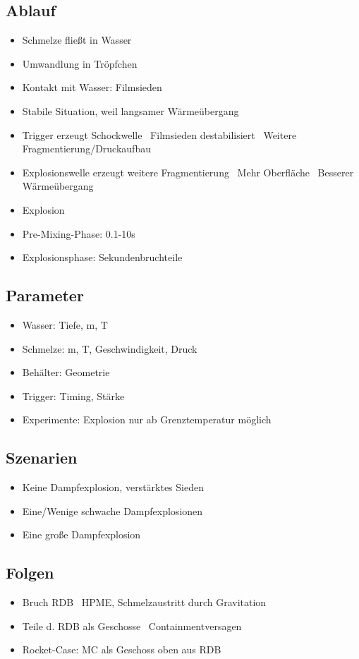 \documentclass[12pt]{article}
\begin{document}
\subsection{Ablauf}
\begin{itemize}[noitemsep]
	\item Schmelze fließt in Wasser
	\item Umwandlung in Tröpfchen
	\item Kontakt mit Wasser: Filmsieden
	\item Stabile Situation, weil langsamer Wärmeübergang
	\item Trigger erzeugt Schockwelle \textrightarrow\ Filmsieden destabilisiert \textrightarrow\ Weitere Fragmentierung/Druckaufbau
	\item Explosionswelle erzeugt weitere Fragmentierung \textrightarrow\ Mehr Oberfläche \textrightarrow\ Besserer Wärmeübergang
	\item Explosion
	\item Pre-Mixing-Phase: 0.1-10s
	\item Explosionsphase: Sekundenbruchteile
\end{itemize}

\subsection{Parameter}
\begin{itemize}[noitemsep]
	\item Wasser: Tiefe, m, T
	\item Schmelze: m, T, Geschwindigkeit, Druck
	\item Behälter: Geometrie
	\item Trigger: Timing, Stärke
	\item Experimente: Explosion nur ab Grenztemperatur möglich
\end{itemize}

\subsection{Szenarien}
\begin{itemize}[noitemsep]
	\item Keine Dampfexplosion, verstärktes Sieden
	\item Eine/Wenige schwache Dampfexplosionen
	\item Eine große Dampfexplosion
\end{itemize}

\subsection{Folgen}
\begin{itemize}[noitemsep]
	\item Bruch RDB \textrightarrow\ HPME, Schmelzaustritt durch Gravitation
	\item Teile d. RDB als Geschosse \textrightarrow\ Containmentversagen
	\item Rocket-Case: MC als Geschoss oben aus RDB
\end{itemize}
\end{document}
